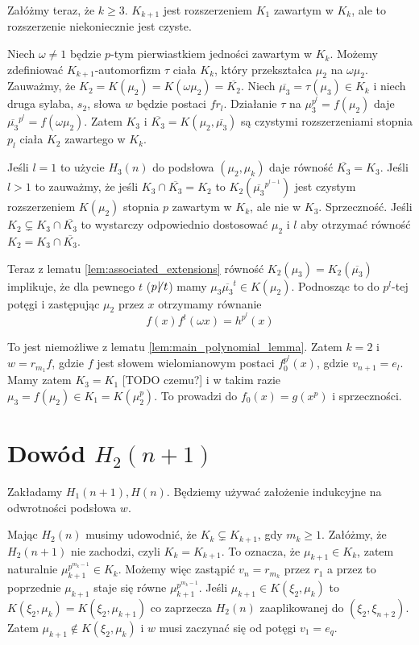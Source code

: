 Załóżmy teraz, że $k \geq 3$. $K_{k+1}$ jest rozszerzeniem $K_1$ zawartym w
$K_k$, ale to rozszerzenie niekoniecznie jest czyste.

Niech $\omega \neq 1$ będzie $p$-tym pierwiastkiem jedności zawartym w $K_k$.
Możemy zdefiniować $K_{k+1}$-automorfizm $\tau$ ciała $K_k$, który przekształca
$\mu_2$ na $\omega \mu_2$.
Zauważmy, że $K_2 = K\left(\mu_2\right) = K\left(\omega \mu_2\right) =
\overline{K_2}$.
Niech $\overline{\mu_3} = \tau(\mu_3) \in K_k$ i niech druga sylaba, $s_2$,
słowa $w$ będzie postaci $fr_l$.
Działanie $\tau$ na $\mu_3^{p^l} = f\left(\mu_2\right)$ daje
$\overline{\mu_3}^{p^l} = f\left(\omega\mu_2\right)$. Zatem $K_3$ i
$\overline{K_3} = K\left(\mu_2, \overline{\mu_3}\right)$ są czystymi
rozszerzeniami stopnia $p_l$ ciała $K_2$ zawartego w $K_k$.

Jeśli $l = 1$ to użycie $H_3(n)$ do podsłowa $\left(\mu_2, \mu_k\right)$ daje
równość $\overline{K_3} = K_3$. Jeśli $l > 1$ to zauważmy, że jeśli $K_3 \cap
\overline{K_3} = K_2$ to $K_2\left(\overline{\mu_3}^{p^{l-1}}\right)$ jest
czystym rozszerzeniem $K\left(\mu_2\right)$ stopnia $p$ zawartym w $K_k$, ale
nie w $K_3$. Sprzeczność. Jeśli $K_2 \subsetneq K_3 \cap \overline{K_3}$ to
wystarczy odpowiednio dostosować $\mu_2$ i $l$ aby otrzymać równość
$K_2 = K_3 \cap \overline{K_3}$.

Teraz z lematu \ref{lem:associated_extensions} równość $K_2\left(\mu_3\right) =
K_2\left(\overline{\mu_3}\right)$ implikuje, że dla pewnego $t$ 
($p \!\! \not \! | \; t$)
mamy $\mu_3\overline{\mu_3}^t \in K\left(\mu_2\right)$. Podnosząc to do
$p^l$-tej potęgi i zastępując $\mu_2$ przez $x$ otrzymamy równanie
\[ f(x)f^t(\omega x) = h^{p^l}(x)\]

To jest niemożliwe z lematu \ref{lem:main_polynomial_lemma}. Zatem $k = 2$ i $w
= r_{m_1}f$, gdzie $f$ jest słowem wielomianowym postaci $f_0^{p^l}(x)$, gdzie
$v_{n+1} = e_l$. Mamy zatem $K_3 = K_1$ [TODO czemu?] i  w takim razie $\mu_3 =
f\left(\mu_2\right) \in K_1 = K\left(\mu_2^p\right)$. To prowadzi do $f_0(x) =
g\left(x^p\right)$ i sprzeczności.

\section{Dowód $H_2(n+1)$}
Zakładamy $H_1(n+1), H(n)$. Będziemy używać założenie indukcyjne na odwrotności
podsłowa $w$.

Mając $H_2(n)$ musimy udowodnić, że $K_k \subsetneq K_{k+1}$, gdy $m_k \geq 1$.
Załóżmy, że $H_2(n+1)$ nie zachodzi, czyli $K_k = K_{k+1}$. To oznacza, że
$\mu_{k+1} \in K_k$, zatem naturalnie $\mu_{k+1}^{p^{m_k -1}} \in K_k$. Możemy
więc zastąpić $v_n = r_{m_k}$ przez $r_1$ a przez to poprzednie $\mu_{k+1}$
staje się równe $\mu_{k+1}^{p^{m_k - 1}}$.
Jeśli $\mu_{k+1} \in K\left(\xi_2, \mu_k\right)$ to $K\left(\xi_2, \mu_k\right)
= K\left(\xi_2, \mu_{k+1}\right)$ co zaprzecza $H_2(n)$ zaaplikowanej do
$\left(\xi_2, \xi_{n+2}\right)$. Zatem $\mu_{k+1} \not \in K\left(\xi_2,
\mu_k\right)$ i $w$ musi zaczynać się od potęgi $v_1 = e_q$.

